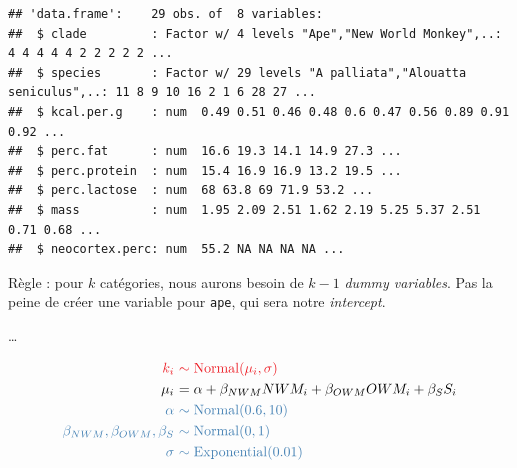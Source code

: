 \documentclass[
  a4paper,11pt,twoside,onecolumn,openright,final,oldfontcommands]{memoir}
\newenvironment{Shaded}{\begin{snugshade}}{\end{snugshade}}
\newcommand{\DecValTok}[1]{\textcolor[rgb]{0.00,0.00,0.81}{#1}}
\newcommand{\FunctionTok}[1]{\textcolor[rgb]{0.00,0.00,0.00}{#1}}
\newcommand{\NormalTok}[1]{#1}
\newcommand{\OtherTok}[1]{\textcolor[rgb]{0.56,0.35,0.01}{#1}}
\newcommand{\SpecialCharTok}[1]{\textcolor[rgb]{0.00,0.00,0.00}{#1}}
\newcommand{\StringTok}[1]{\textcolor[rgb]{0.31,0.60,0.02}{#1}}
\theoremstyle{definition}
\theoremstyle{definition}
\theoremstyle{definition}
\theoremstyle{remark}
\begin{document}
\begin{verbatim}
## 'data.frame':    29 obs. of  8 variables:
##  $ clade         : Factor w/ 4 levels "Ape","New World Monkey",..: 4 4 4 4 4 2 2 2 2 2 ...
##  $ species       : Factor w/ 29 levels "A palliata","Alouatta seniculus",..: 11 8 9 10 16 2 1 6 28 27 ...
##  $ kcal.per.g    : num  0.49 0.51 0.46 0.48 0.6 0.47 0.56 0.89 0.91 0.92 ...
##  $ perc.fat      : num  16.6 19.3 14.1 14.9 27.3 ...
##  $ perc.protein  : num  15.4 16.9 16.9 13.2 19.5 ...
##  $ perc.lactose  : num  68 63.8 69 71.9 53.2 ...
##  $ mass          : num  1.95 2.09 2.51 1.62 2.19 5.25 5.37 2.51 0.71 0.68 ...
##  $ neocortex.perc: num  55.2 NA NA NA NA ...
\end{verbatim}

Règle : pour \(k\) catégories, nous aurons besoin de \(k - 1\) \emph{dummy variables}. Pas la peine de créer une variable pour \texttt{ape}, qui sera notre \emph{intercept}.

\begin{Shaded}
\end{Shaded}

\ldots{}

\[
\begin{aligned}
\color{orangered}{k_{i}} \ &\color{orangered}{\sim \mathrm{Normal}(\mu_{i}, \sigma)} \\
\color{black}{\mu_{i}} \ &\color{black}{= \alpha + \beta_{NWM}NWM_{i} + \beta_{OWM}OWM_{i} + \beta_{S}S_{i}} \\
\color{steelblue}{\alpha} \ &\color{steelblue}{\sim \mathrm{Normal}(0.6, 10)} \\
\color{steelblue}{\beta_{NWM}, \beta_{OWM}, \beta_{S}} \ &\color{steelblue}{\sim \mathrm{Normal}(0, 1)} \\
\color{steelblue}{\sigma} \ &\color{steelblue}{\sim \mathrm{Exponential}(0.01)}
\end{aligned}
\]
\end{document}
